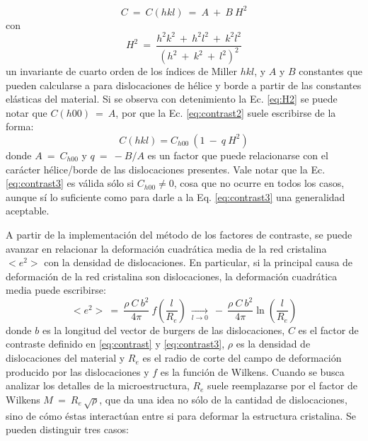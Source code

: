 \begin{equation}
  C \ = \ C(hkl) \ = \ A \ + \ B \ H^2
  \label{eq:contrast2}
\end{equation}
\noindent
con
\begin{equation}
  H^2 \ = \ \frac{h^2k^2 \ + \ h^2l^2 \ + \ k^2l^2}{(h^2 \ + \ k^2 \ + \ l^2)^2}
  \label{eq:H2}
\end{equation}
\noindent
un invariante de cuarto orden de los índices de Miller $hkl$, y $A$ y $B$ constantes que pueden calcularse a para dislocaciones de hélice y borde a partir de las constantes elásticas del material.
Si se observa con detenimiento la Ec. \ref{eq:H2} se puede notar que $C(h00) \ = \ A$, por que la Ec. \ref{eq:contrast2} suele escribirse de la forma:
\begin{equation}
  C(hkl) = C_{h00}\ (1 \ - \ q\ H^2)
  \label{eq:contrast3}
\end{equation}
\noindent
donde $A \ = \ C_{h00}$ y $q \ = \ -B/A$ es un factor que puede relacionarse con el carácter hélice/borde de las dislocaciones presentes.
Vale notar que la Ec. \ref{eq:contrast3} es válida sólo si $C_{h00} \neq 0$, cosa que no ocurre en todos los casos, aunque sí lo suficiente como para darle a la Eq. \ref{eq:contrast3} una generalidad aceptable.

A partir de la implementación del método de los factores de contraste, se puede avanzar en relacionar la deformación cuadrática media de la red cristalina $<e^2>$ con la densidad de dislocaciones. En particular, si la principal causa de deformación de la red cristalina son dislocaciones, la deformación cuadrática media puede escribirse\cite{Wilkens1970}:
\begin{equation}
  <e^2> \ = \ \frac{\rho \ C \ b^2}{4 \pi} \ f\left(\frac{l}{R_e}\right) \ \xrightarrow[l \to 0]{} \ - \ \frac{\rho \ C \ b^2}{4 \pi} \ln \left(\frac{l}{R_e}\right)
  \label{eq:Wilkens}
\end{equation}
\noindent
donde $b$ es la longitud del vector de burgers de las dislocaciones, $C$ es el factor de contraste definido en \ref{eq:contrast} y \ref{eq:contrast3}, $\rho$ es la densidad de dislocaciones del material y $R_e$ es el radio de corte del campo de deformación producido por las dislocaciones y $f$ es la función de Wilkens. 
Cuando se busca analizar los detalles de la microestructura, $R_e$ suele reemplazarse por el factor de Wilkens $M \ = \ R_e\,\sqrt{\rho}$, que da una idea no sólo de la cantidad de dislocaciones, sino de cómo éstas interactúan entre si para deformar la estructura cristalina. Se pueden distinguir tres casos:

